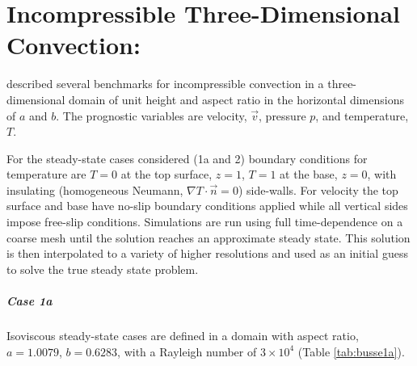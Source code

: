%
%
%
%
%

\chapter{Incompressible Three-Dimensional Convection: \citeauthor{Busse1993}} \label{sec:busse}

\citet{Busse1993} described several benchmarks for
incompressible convection in a three-dimensional domain of unit height
and aspect ratio in the horizontal dimensions of $a$ and $b$.  The prognostic variables are velocity, $\vec{v}$,
pressure $p$, and temperature, $T$.

For the steady-state cases considered (1a and 2) boundary conditions for temperature are $T=0$ at the top surface, $z=1$, $T=1$ at the base, $z=0$,
with insulating (homogeneous Neumann, $\nabla T\cdot\vec{n} = 0$) side-walls.  For velocity the top surface and base have no-slip
boundary conditions applied while all vertical sides impose free-slip conditions.
Simulations are run using full time-dependence on a coarse mesh until the solution reaches an approximate steady state.  This
solution is then interpolated to a variety of higher resolutions and used as an initial guess to solve the true steady state
problem.

\paragraph{Case 1a}
Isoviscous steady-state cases are defined in a domain with aspect ratio, $a=1.0079$, $b=0.6283$,
with a Rayleigh number of $3\times10^4$ (Table \ref{tab:busse1a}).

